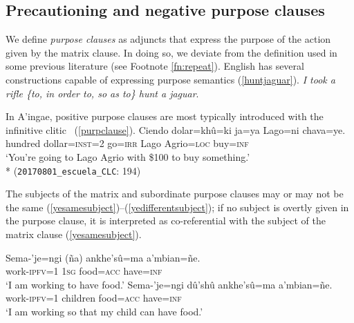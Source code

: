 \documentclass[output=paper,colorlinks,citecolor=brown]{langscibook}
\begin{document}

\subsection{Precautioning and negative purpose clauses} \label{sec:comparison}

We define \textit{purpose clauses} as adjuncts that express the purpose of the action given by the matrix clause. In doing so, we deviate from the definition used in some previous literature (see Footnote \ref{fn:repeat}). English has several constructions capable of expressing purpose semantics (\ref{huntjaguar}).
    \ea \label{huntjaguar}
    \glt \textit{I took a rifle \textup{\{}to, in order to, so as to\textup{\}} hunt a jaguar}.
    \z 
    
In A'ingae, positive purpose clauses are most typically introduced with the infinitive clitic ~(\ref{purpclause}).
    \ea \label{purpclause} %
    \gll Ciendo  dolar=khû=ki  ja=ya      Lago=ni            {\ob}chava=ye.{\cb} \\
         hundred dollar=\textsc{inst=}2 go=\textsc{irr} {Lago Agrio}=\textsc{loc} buy=\textsc{inf} \\
    \glt `You're going to Lago Agrio with \$100 to buy something.' \\*
    \hfill (\texttt{20170801\_escuela\_CLC}: {\textsc{194}})
    \z 

The subjects of the matrix and subordinate purpose clauses may or may not be the same (\ref{yesamesubject})--(\ref{yedifferentsubject}); if no subject is overtly given in the purpose clause, it is interpreted as co-referential with the subject of the matrix clause (\ref{yesamesubject}). 
\begin{exe}
    \ex \label{yesamesubject}
    \gll Sema-'je=ngi    {{\ob}\rm(}ña{\rm)}   ankhe'sû=ma a'mbian=ñe.{\cb} \\
         work-\textsc{ipfv=1} \textsc{1sg} food=\textsc{acc}   have=\textsc{inf} \\
    \glt `I am working to have food.'
    \ex \label{yedifferentsubject}
    \gll Sema-'je=ngi    {\ob}dû'shû  ankhe'sû=ma a'mbian=ñe.{\cb} \\
         work-\textsc{ipfv=1} children    food=\textsc{acc}   have=\textsc{inf} \\
    \glt `I am working so that my child can have food.'
\end{exe}
\end{document}
